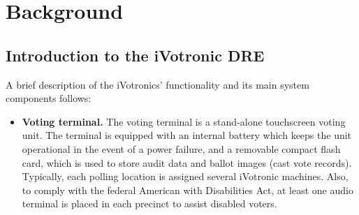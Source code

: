 \section{Background}
\label{sec:background}
\subsection{Introduction to the iVotronic DRE}
A brief description of the iVotronics' functionality and its main system components follows:

\begin{itemize} 
\item \textbf{Voting terminal.} The voting terminal is a stand-alone touchscreen voting unit.  The terminal is equipped with an internal battery which keeps the unit operational in the event of a power failure, and a removable compact flash card, which is used to store audit data and ballot images (cast vote records). Typically, each polling location is assigned several iVotronic machines. Also, to comply with the federal American with Disabilities Act, at least one audio terminal is placed in each precinct to assist disabled voters.


\end{itemize}
